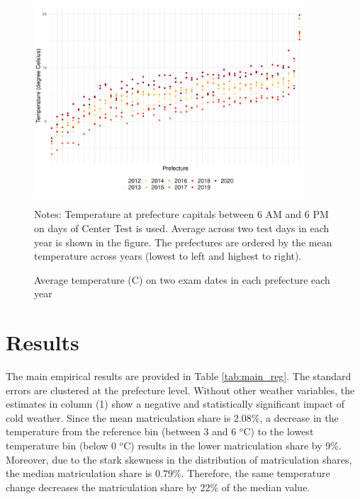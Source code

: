 \documentclass[12pt,letterpaper]{article}
\begin{document}
\begin{figure}[H]
  \centering
  \caption{Average temperature (\degree C) on two exam dates in each prefecture each year}
  \includegraphics[width = 0.9\textwidth]{../Output/images/temperature_diff.pdf}
  \label{fig:temperature_diff}
  \footnotesize
  \begin{tablenotes}
    \item Notes:
      Temperature at prefecture capitals between 6 AM and 6 PM on days of Center Test is used.
      Average across two test days in each year is shown in the figure.
      The prefectures are ordered by the mean temperature across years (lowest to left and highest to right).
  \end{tablenotes}
\end{figure}

\section{Results}\label{sec:results}

The main empirical results are provided in Table \ref{tab:main_reg}.
The standard errors are clustered at the prefecture level.
Without other weather variables, the estimates in column (1) show a negative and statistically significant impact of cold weather.
Since the mean matriculation share is $2.08$\%, a decrease in the temperature from the reference bin (between 3 and 6 $^o$C) to the lowest temperature bin (below 0 $^o$C) results in the lower matriculation share by 9\%.
Moreover, due to the stark skewness in the distribution of matriculation shares, the median matriculation share is $0.79$\%.
Therefore, the same temperature change decreases the matriculation share by 22\% of the median value.
\end{document}
